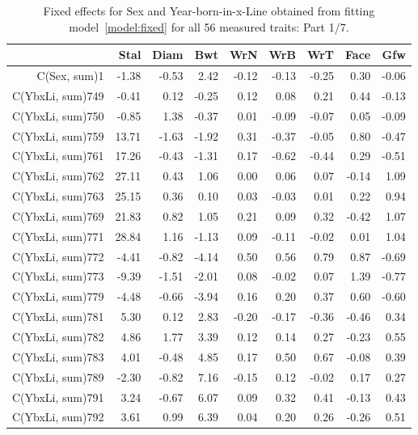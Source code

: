 \begin{table}[p]
\centering
\caption{Fixed effects for Sex and Year-born-in-x-Line obtained from fitting model~\ref{model:fixed} for all 56 measured traits: Part 1/7.}
\label{tab:b1}
\begin{tabular}{rrrrrrrrr}
  \hline
 & Stal & Diam & Bwt & WrN & WrB & WrT & Face & Gfw \\ 
  \hline
C(Sex, sum)1 & -1.38 & -0.53 & 2.42 & -0.12 & -0.13 & -0.25 & 0.30 & -0.06 \\ 
  C(YbxLi, sum)749 & -0.41 & 0.12 & -0.25 & 0.12 & 0.08 & 0.21 & 0.44 & -0.13 \\ 
  C(YbxLi, sum)750 & -0.85 & 1.38 & -0.37 & 0.01 & -0.09 & -0.07 & 0.05 & -0.09 \\ 
  C(YbxLi, sum)759 & 13.71 & -1.63 & -1.92 & 0.31 & -0.37 & -0.05 & 0.80 & -0.47 \\ 
  C(YbxLi, sum)761 & 17.26 & -0.43 & -1.31 & 0.17 & -0.62 & -0.44 & 0.29 & -0.51 \\ 
  C(YbxLi, sum)762 & 27.11 & 0.43 & 1.06 & 0.00 & 0.06 & 0.07 & -0.14 & 1.09 \\ 
  C(YbxLi, sum)763 & 25.15 & 0.36 & 0.10 & 0.03 & -0.03 & 0.01 & 0.22 & 0.94 \\ 
  C(YbxLi, sum)769 & 21.83 & 0.82 & 1.05 & 0.21 & 0.09 & 0.32 & -0.42 & 1.07 \\ 
  C(YbxLi, sum)771 & 28.84 & 1.16 & -1.13 & 0.09 & -0.11 & -0.02 & 0.01 & 1.04 \\ 
  C(YbxLi, sum)772 & -4.41 & -0.82 & -4.14 & 0.50 & 0.56 & 0.79 & 0.87 & -0.69 \\ 
  C(YbxLi, sum)773 & -9.39 & -1.51 & -2.01 & 0.08 & -0.02 & 0.07 & 1.39 & -0.77 \\ 
  C(YbxLi, sum)779 & -4.48 & -0.66 & -3.94 & 0.16 & 0.20 & 0.37 & 0.60 & -0.60 \\ 
  C(YbxLi, sum)781 & 5.30 & 0.12 & 2.83 & -0.20 & -0.17 & -0.36 & -0.46 & 0.34 \\ 
  C(YbxLi, sum)782 & 4.86 & 1.77 & 3.39 & 0.12 & 0.14 & 0.27 & -0.23 & 0.55 \\ 
  C(YbxLi, sum)783 & 4.01 & -0.48 & 4.85 & 0.17 & 0.50 & 0.67 & -0.08 & 0.39 \\ 
  C(YbxLi, sum)789 & -2.30 & -0.82 & 7.16 & -0.15 & 0.12 & -0.02 & 0.17 & 0.27 \\ 
  C(YbxLi, sum)791 & 3.24 & -0.67 & 6.07 & 0.09 & 0.32 & 0.41 & -0.13 & 0.43 \\ 
  C(YbxLi, sum)792 & 3.61 & 0.99 & 6.39 & 0.04 & 0.20 & 0.26 & -0.26 & 0.51 \\ 

\end{tabular}
\end{table}

